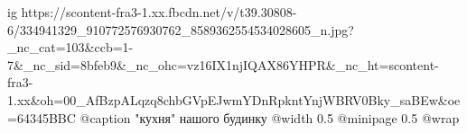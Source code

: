  
 
 
 
 

\ifcmt
  ig https://scontent-fra3-1.xx.fbcdn.net/v/t39.30808-6/334941329_910772576930762_8589362554534028605_n.jpg?_nc_cat=103&ccb=1-7&_nc_sid=8bfeb9&_nc_ohc=vz16IX1njIQAX86YHPR&_nc_ht=scontent-fra3-1.xx&oh=00_AfBzpALqzq8chbGVpEJwmYDnRpkntYnjWBRV0Bky_saBEw&oe=64345BBC
  @caption "кухня" нашого будинку
  @width 0.5
  @minipage 0.5
  @wrap \parpic[r]
\fi

